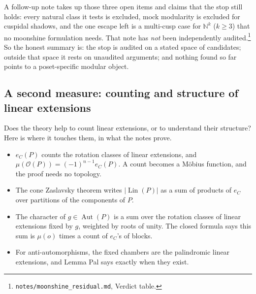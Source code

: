 \documentclass[11pt]{article}
\theoremstyle{definition}
\theoremstyle{remark}
\newcommand{\OP}{\mathcal O}
\newcommand{\Lin}{\operatorname{Lin}}
\newcommand{\Aut}{\operatorname{Aut}}
\newcommand{\src}[1]{\nolinkurl{#1}}
\newcommand{\tagbox}[1]{\leavevmode\marginpar{\raggedright\fbox{\parbox{0.66in}{\centering\scriptsize\sffamily #1}}}}
\newcommand{\PARTIAL}{\tagbox{PROVEN\\NOT AUDITED}}
\begin{document}
A follow-up note takes up those three open items and claims that the stop
still holds: every natural class it tests is excluded, mock modularity is
excluded for cuspidal shadows, and the one escape left is a multi-cusp case
for $\mathbb N^k$ ($k\ge3$) that no moonshine formulation needs. That note
has \emph{not} been independently audited.\footnote{%
\src{notes/moonshine_residual.md}, Verdict table.}\PARTIAL{} So the honest
summary is: the stop is audited on a stated space of candidates; outside that
space it rests on unaudited arguments; and nothing found so far points to a
poset-specific modular object.

\subsection{A second measure: counting and structure of linear extensions}

Does the theory help to count linear extensions, or to understand their
structure? Here is where it touches them, in what the notes prove.
\begin{itemize}
\item $e_C(P)$ counts the rotation classes of linear extensions, and
  $\mu(\OP(P))=(-1)^{n-1}e_C(P)$. A count becomes a M\"obius function, and the
  proof needs no topology.
\item The cone Zaslavsky theorem writes $|\Lin(P)|$ as a sum of products of
  $e_C$ over partitions of the components of $P$.
\item The character of $g\in\Aut(P)$ is a sum over the rotation classes of
  linear extensions fixed by $g$, weighted by roots of unity. The closed
  formula says this sum is $\mu(o)$ times a count of $e_C$'s of blocks.
\item For anti-automorphisms, the fixed chambers are the palindromic linear
  extensions, and Lemma Pal says exactly when they exist.
\end{itemize}
\end{document}
